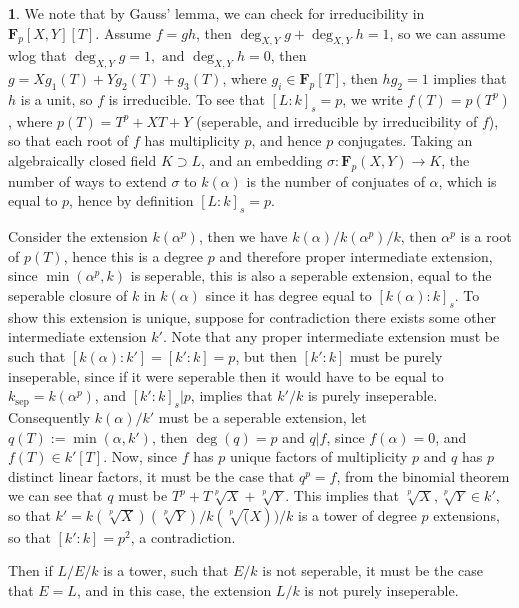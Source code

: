 \documentclass[11pt]{article}
\theoremstyle{definition}
\newtheorem{pb}{}
\newcommand{\tand}{\text{ and }}
\begin{document}
    \begin{pb}
        We note that by Gauss' lemma, we can check for irreducibility in \(\mathbf{F}_p[X,Y][T]\). Assume \(f = gh\), then \(\deg_{X,Y}g + \deg_{X,Y}h = 1\), so we can assume wlog
        that \(\deg_{X,Y}g = 1, \tand \deg_{X,Y}h = 0\), then \(g = Xg_1(T) + Yg_2(T) + g_3(T)\), where \(g_i \in \mathbf{F}_p[T]\), then \(hg_2 = 1\) implies that \(h\) is a unit, so \(f\)
        is irreducible. To see that \([L:k]_s = p\), we write \(f(T) = p(T^p)\), where \(p(T) = T^p + XT + Y\) (seperable, and irreducible by irreducibility of \(f\)), so that each root of \(f\) has
        multiplicity \(p\), and hence \(p\) conjugates. Taking an algebraically closed field \(K \supset L\), and an embedding \(\sigma: \mathbf{F}_p(X,Y) \to K\), the number of ways to
        extend \(\sigma\) to \(k(\alpha)\) is the number of conjuates of \(\alpha\), which is equal to \(p\), hence by definition \([L:k]_s = p\).

        Consider the extension \(k(\alpha^p)\), then we have \(k(\alpha)/k(\alpha^p)/k\), then \(\alpha^p\) is a root of \(p(T)\), hence this is a degree \(p\)
        and therefore proper intermediate extension, since \(\min(\alpha^p,k)\) is seperable, this is also a seperable extension, equal to the seperable closure of \(k\) in \(k(\alpha)\)
        since it has degree equal to \([k(\alpha):k]_s\).
        To show this extension is unique, suppose for contradiction there exists some other intermediate extension \(k'\).
        Note that any proper intermediate extension must be such that \([k(\alpha):k'] = [k':k] = p\),
        but then \([k':k]\) must be purely inseperable, since if it were seperable then it would have to be equal to \(k_{\text{sep}} = k(\alpha^p)\), and \([k':k]_s \vert p\), implies
        that \(k'/k\) is purely inseperable. Consequently \(k(\alpha)/k'\) must be a seperable extension, let \(q(T) := \min(\alpha,k')\), then \(\deg(q) = p\) and \(q \vert f\), since
        \(f(\alpha) = 0\), and \(f(T) \in k'[T]\). Now, since \(f\) has \(p\) unique factors of multiplicity \(p\) and \(q\) has \(p\) distinct linear factors, it must be the case that 
        \(q^p = f\), from the binomial theorem we can see that \(q\) must be \(T^p + T\sqrt[p]{X} + \sqrt[p]{Y}\). This implies that \(\sqrt[p]{X},\sqrt[p]{Y} \in k'\), so that
        \(k' = k(\sqrt[p]{X})(\sqrt[p]{Y})/k(\sqrt[p](X))/k\) is a tower of degree \(p\) extensions, so that \([k':k] = p^2\), a contradiction.

        Then if \(L/E/k\) is a tower, such that \(E/k\) is not seperable, it must be the case that \(E = L\), and in this case, the extension \(L/k\) is not purely inseperable.
    \end{pb}
\end{document}
